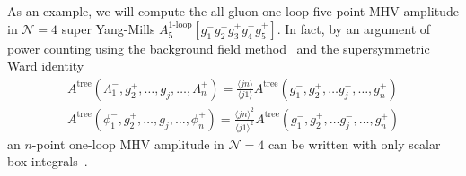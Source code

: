 \\\\
As an example, we will compute the all-gluon one-loop five-point MHV amplitude in $\mathcal{N} = 4$ super Yang-Mills $A_5^{\textrm{1-loop}}[g_1^- g_2^- g_3^+ g_4^+ g_5^+]$. 
In fact, by an argument of power counting using the background field method~\cite{Gates:1983nr} and the supersymmetric Ward identity\begin{equation}\label{super_wi}
\begin{split}
A^{\mathrm{tree}}(\Lambda_1^-, g_2^+, \ldots, g_j, \ldots, \Lambda_n^+)
= \frac{\langle jn \rangle}{\langle j 1 \rangle}
A^{\mathrm{tree}}(g_1^-, g_2^+, \ldots g_j^-, \ldots , g_n^+)
\\
A^{\mathrm{tree}}(\phi_1^-, g_2^+, \ldots, g_j, \ldots, \phi_n^+)
= \frac{\langle jn \rangle^2}{\langle j 1 \rangle^2}
A^{\mathrm{tree}}(g_1^-, g_2^+, \ldots g_j^-, \ldots , g_n^+)
\end{split}
\end{equation}
an $n$-point one-loop MHV amplitude in $\mathcal{\mathcal{N}} = 4$ can be written with only scalar box integrals~\cite{Bern:1994zx}.